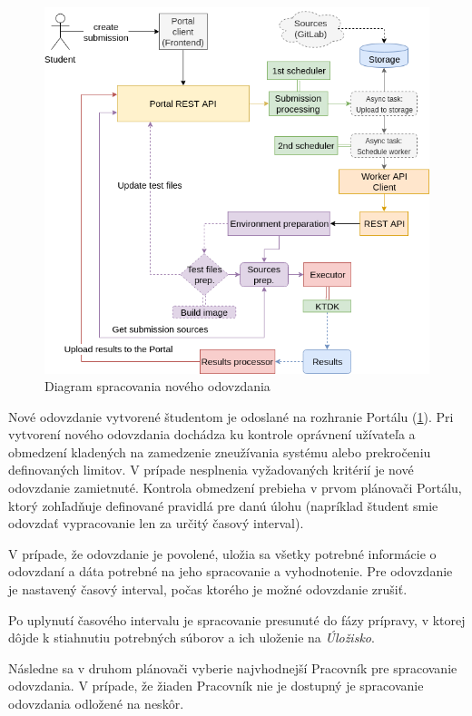 \documentclass[
  digital, %
  oneside, %
  table,   %
  lof,     %
  lot,   %
]{fithesis3}
\begin{document}
\begin{figure}[!ht]
  \begin{center}
    \includegraphics[width=\textwidth]{imgs/create-subm.png}
  \end{center}
    \caption{Diagram spracovania nového odovzdania}
    \label{fig:create-subm}
\end{figure}


Nové odovzdanie vytvorené študentom je odoslané na rozhranie Portálu (\ref{fig:create-subm}). Pri vytvorení nového odovzdania dochádza ku kontrole oprávnení užívateľa a obmedzení kladených na zamedzenie zneužívania systému alebo prekročeniu definovaných limitov. V prípade nesplnenia vyžadovaných kritérií je nové odovzdanie zamietnuté. Kontrola obmedzení prebieha v prvom plánovači Portálu, ktorý zohľadňuje definované pravidlá pre danú úlohu (napríklad študent smie odovzdať vypracovanie len za určitý časový interval).

V prípade, že odovzdanie je povolené, uložia sa všetky potrebné informácie o odovzdaní a dáta potrebné na jeho spracovanie a vyhodnotenie. Pre odovzdanie je nastavený časový interval, počas ktorého je možné odovzdanie zrušiť.

Po uplynutí časového intervalu je spracovanie presunuté do fázy prípravy, v ktorej dôjde k stiahnutiu potrebných súborov a ich uloženie na \emph{Úložisko}.

Následne sa v druhom plánovači vyberie najvhodnejší Pracovník pre spracovanie odovzdania. V prípade, že žiaden Pracovník nie je dostupný je spracovanie odovzdania odložené na neskôr.
\end{document}

